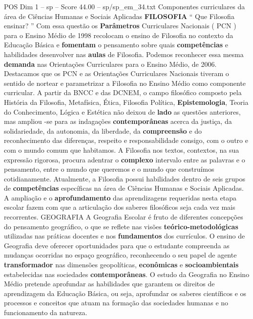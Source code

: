 \begin{textsample}{POS Dim 1 – sp – Score 44.00 – sp/sp\_em\_34.txt}  \label{ex:f1_pos_113}
Componentes curriculares da área de Ciências Humanas e Sociais Aplicadas \textbf{FILOSOFIA} “ Que Filosofia ensinar? ” Com essa questão os \textbf{Parâmetros} Curriculares Nacionais ( PCN ) para o Ensino Médio de 1998 recolocam o ensino de Filosofia no contexto da Educação Básica e \textbf{fomentam} o pensamento sobre quais \textbf{competências} e habilidades desenvolver nas \textbf{aulas} de Filosofia.
Podemos reconhecer essa mesma \textbf{demanda} nas Orientações Curriculares para o Ensino Médio, de 2006.
Destacamos que os PCN e as Orientações Curriculares Nacionais tiveram o sentido de nortear e parametrizar a Filosofia no Ensino Médio como componente curricular.
A partir da BNCC e das DCNEM, o campo filosófico composto pela História da Filosofia, Metafísica, Ética, Filosofia Política, \textbf{Epistemologia}, Teoria do Conhecimento, Lógica e Estética não deixou de \textbf{lado} as questões anteriores, mas ampliou -se para as indagações \textbf{contemporâneas} acerca da justiça, da solidariedade, da autonomia, da liberdade, da \textbf{compreensão} e do reconhecimento das diferenças, respeito e responsabilidade consigo, com o outro e com o mundo comum que habitamos.
A Filosofia nos textos, contextos, na sua expressão rigorosa, procura adentrar o \textbf{complexo} intervalo entre as palavras e o pensamento, entre o mundo que queremos e o mundo que construímos cotidianamente.
Atualmente, a Filosofia possui habilidades dentro de seis grupos de \textbf{competências} específicas na área de Ciências Humanas e Sociais Aplicadas.
A ampliação e o \textbf{aprofundamento} das aprendizagens requeridas nesta etapa escolar fazem com que a articulação dos saberes filosóficos seja cada vez mais recorrentes.
GEOGRAFIA A Geografia Escolar é fruto de diferentes concepções do pensamento geográfico, o que se reflete nas visões \textbf{teórico-metodológicas} utilizadas nas práticas docentes e nos \textbf{fundamentos} dos currículos.
O ensino de Geografia deve oferecer oportunidades para que o estudante compreenda as mudanças ocorridas no espaço geográfico, reconhecendo o seu papel de agente \textbf{transformador} nas dimensões geopolíticas, \textbf{econômicas} e \textbf{socioambientais} estabelecidas nas sociedades \textbf{contemporâneas}.
O estudo da Geografia no Ensino Médio pretende aprofundar as habilidades que garantem os direitos de aprendizagem da Educação Básica, ou seja, aprofundar os saberes científicos e os processos e conceitos que atuam na formação das sociedades humanas e no funcionamento da natureza.

\end{textsample}
